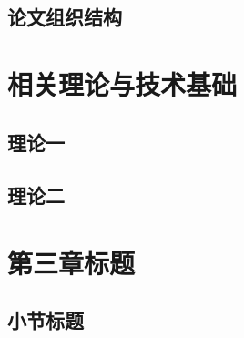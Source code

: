 \documentclass[12pt, a4paper, UTF8]{ctexart}
\numberwithin{equation}{section}
\begin{document}
\subsection{论文组织结构}


\section{相关理论与技术基础}

\subsection{理论一}



\subsection{理论二}


\section{第三章标题}

\subsection{小节标题}



\end{document}
